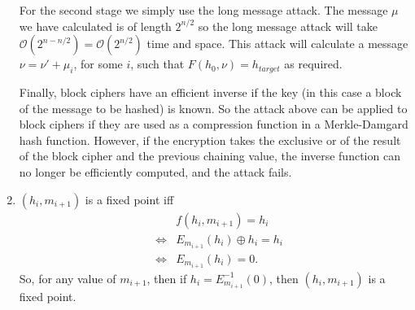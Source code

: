 \begin{enumerate}
For the second stage we simply use the long message attack. The message $\mu$
we have calculated is of length $2^{n/2}$ so the long message attack will take
$\mathcal{O}(2^{n-n/2})=\mathcal{O}(2^{n/2})$ time and space. This attack will
calculate a message $\nu=\nu'+\mu_i$, for some $i$, such that $F(h_0,\nu)=h_{target}$
as required.

Finally, block ciphers have an efficient inverse if the key (in this case a block
of the message to be hashed) is known. So the attack above can be applied to block ciphers
if they are used as a compression function in a Merkle-Damgard hash function. However, if the encryption
takes the exclusive or of the result of the block cipher and the previous chaining
value, the inverse function can no longer be efficiently computed, and the attack fails.

\item $(h_i,m_{i+1})$ is a fixed point iff 
	\begin{eqnarray*}
		&&f(h_i,m_{i+1})=h_i \\
		&\Leftrightarrow& E_{m_{i+1}}(h_i)\oplus h_i = h_i \\
		&\Leftrightarrow& E_{m_{i+1}}(h_i)=0.
	\end{eqnarray*}
	So, for any value of $m_{i+1}$, then if $h_i=E^{-1}_{m_{i+1}}(0)$, then $(h_i,m_{i+1})$ is a fixed point.
\end{enumerate}
